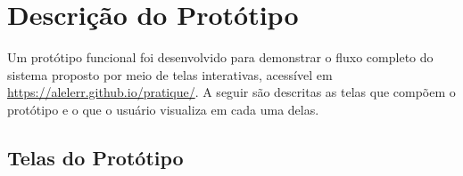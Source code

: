 \documentclass[
  article,
  a4paper,
  12pt,
  oneside,
  fleqn
]{abntex2}
\begin{document}
\section{Descrição do Protótipo}

Um protótipo funcional foi desenvolvido para demonstrar o fluxo completo do sistema proposto por meio de telas interativas, acessível em \url{https://alelerr.github.io/pratique/}. A seguir são descritas as telas que compõem o protótipo e o que o usuário visualiza em cada uma delas.


\subsection{Telas do Protótipo}
\end{document}
